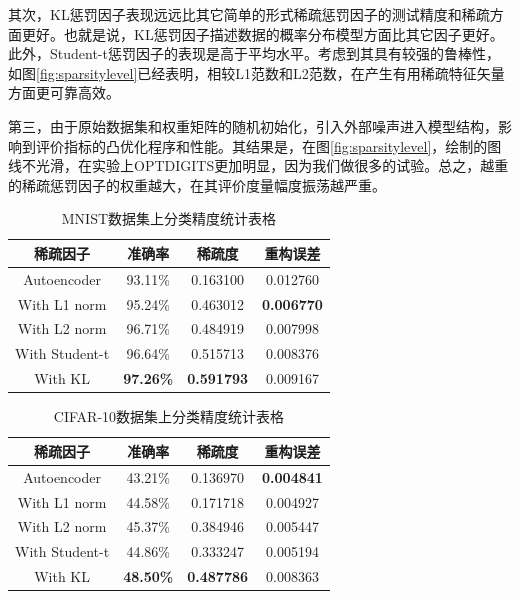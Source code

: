 \documentclass[oneside]{ZJUthesis}
\begin{document}
其次，KL惩罚因子表现远远比其它简单的形式稀疏惩罚因子的测试精度和稀疏方面更好。也就是说，KL惩罚因子描述数据的概率分布模型方面比其它因子更好。此外，Student-t惩罚因子的表现是高于平均水平。考虑到其具有较强的鲁棒性，如图\ref{fig:sparsitylevel}已经表明，相较L1范数和L2范数，在产生有用稀疏特征矢量方面更可靠高效。

第三，由于原始数据集和权重矩阵的随机初始化，引入外部噪声进入模型结构，影响到评价指标的凸优化程序和性能。其结果是，在图\ref{fig:sparsitylevel}，绘制的图线不光滑，在实验上OPTDIGITS更加明显，因为我们做很多的试验。总之，越重的稀疏惩罚因子的权重越大，在其评价度量幅度振荡越严重。
\begin{table}[h]
\begin{center}
{
\caption{MNIST数据集上分类精度统计表格}\label{tab:result_mnist}}
\begin{tabular}{|c|c|c|c|}
\hline
稀疏因子 & 准确率 & 稀疏度 & 重构误差 \\
\hline
Autoencoder    & 93.11\% & 0.163100   & 0.012760 \\
\hline
With L1 norm   & 95.24\% & 0.463012 & \textbf{0.006770} \\
\hline
With L2 norm   & 96.71\% & 0.484919 & 0.007998 \\
\hline
With Student-t & 96.64\% & 0.515713 & 0.008376 \\
\hline
With KL        & \textbf{97.26\%} & \textbf{0.591793} & 0.009167 \\
\hline
\end{tabular}
\end{center}
\end{table}

\begin{table}[h]
\begin{center}
{
\caption{CIFAR-10数据集上分类精度统计表格}\label{result_cifar}}
\begin{tabular}{|c|c|c|c|}
\hline
稀疏因子 & 准确率 & 稀疏度 & 重构误差 \\
\hline
Autoencoder    & 43.21\%   & 0.136970 & \textbf{0.004841} \\
\hline
With L1 norm   & 44.58\%   & 0.171718 & 0.004927 \\
\hline
With L2 norm   & 45.37\%   & 0.384946 & 0.005447 \\
\hline
With Student-t &  44.86\%  & 0.333247 & 0.005194 \\
\hline
With KL  & \textbf{48.50\%} & \textbf{0.487786} & 0.008363 \\
\hline
\end{tabular}
\end{center}
\end{table}
\end{document}
